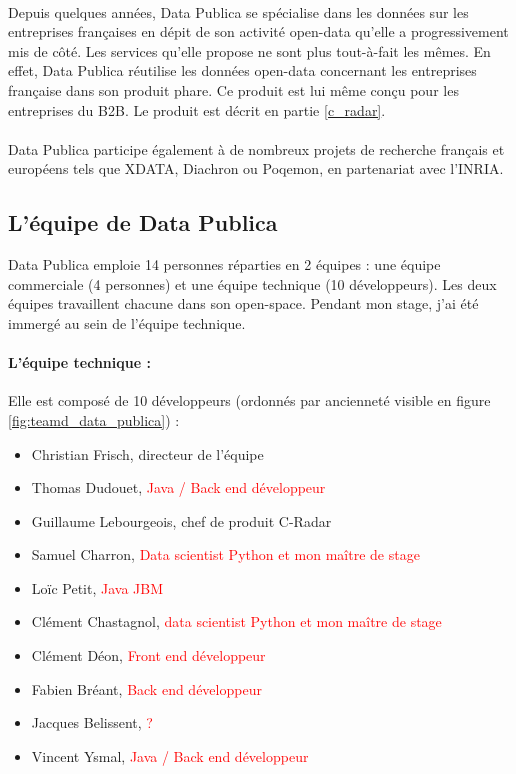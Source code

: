         \paragraph{}
            Depuis quelques années, Data Publica se spécialise dans les données sur les entreprises françaises en dépit de son activité open-data qu'elle a progressivement mis de côté. Les services qu'elle propose ne sont plus tout-à-fait les mêmes. En effet, Data Publica réutilise les données open-data concernant les entreprises française dans son produit phare. Ce produit est lui même conçu pour les entreprises du B2B. Le produit est décrit en partie \ref{c_radar}.

        \paragraph{}
            Data Publica participe également à de nombreux projets de recherche français et européens tels que XDATA, Diachron ou Poqemon, en partenariat avec l'INRIA.

    \subsection{L'équipe de Data Publica}
        Data Publica emploie 14 personnes réparties en 2 équipes : une équipe commerciale (4 personnes) et une équipe technique (10 développeurs). Les deux équipes travaillent chacune dans son open-space. Pendant mon stage, j'ai été immergé au sein de l'équipe technique.

        \paragraph{L'équipe technique :}
            Elle est composé de 10 développeurs (ordonnés par ancienneté visible en figure \ref{fig:teamd_data_publica}) :
            \begin{itemize}
                \item Christian Frisch, directeur de l'équipe
                \item Thomas Dudouet, \textcolor{red}{Java / Back end développeur}
                \item Guillaume Lebourgeois, chef de produit C-Radar
                \item Samuel Charron, \textcolor{red}{Data scientist Python et mon maître de stage}
                \item Loïc Petit, \textcolor{red}{Java JBM}
                \item Clément Chastagnol, \textcolor{red}{data scientist Python et mon maître de stage}
                \item Clément Déon, \textcolor{red}{Front end développeur}
                \item Fabien Bréant, \textcolor{red}{Back end développeur}
                \item Jacques Belissent, \textcolor{red}{?}
                \item Vincent Ysmal, \textcolor{red}{Java / Back end développeur}
            \end{itemize}

